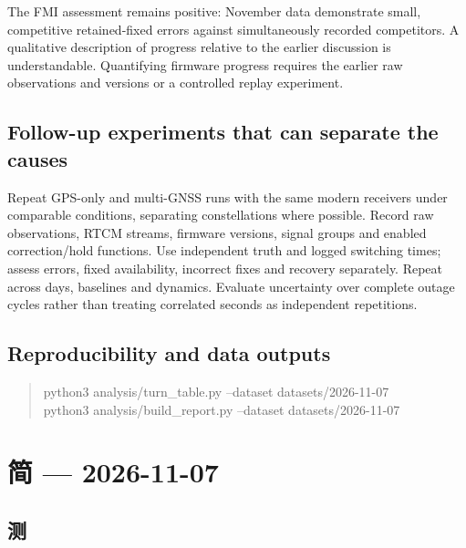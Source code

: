 \documentclass[11pt,a4paper]{article}
\numberwithin{equation}{section}
\numberwithin{figure}{section}
\begin{document}
The FMI assessment remains positive: November data demonstrate small, competitive retained-fixed errors against simultaneously recorded competitors. A qualitative description of progress relative to the earlier discussion is understandable. Quantifying firmware progress requires the earlier raw observations and versions or a controlled replay experiment.

\subsection{Follow-up experiments that can separate the causes}

Repeat GPS-only and multi-GNSS runs with the same modern receivers under comparable conditions, separating constellations where possible. Record raw observations, RTCM streams, firmware versions, signal groups and enabled correction/\allowbreak{}hold functions. Use independent truth and logged switching times; assess errors, fixed availability, incorrect fixes and recovery separately. Repeat across days, baselines and dynamics. Evaluate uncertainty over complete outage cycles rather than treating correlated seconds as independent repetitions.

\subsection{Reproducibility and data outputs}

\begin{quote}\ttfamily\footnotesize python3 analysis/\allowbreak{}turn\_table.py --dataset datasets/\allowbreak{}2026-11-07\\python3 analysis/\allowbreak{}build\_report.py --dataset datasets/\allowbreak{}2026-11-07\end{quote}

\clearpage\section{{\cjkfont 简}\allowbreak{} — 2026-11-07}

\subsection{{\cjkfont 测}\allowbreak{}}
\end{document}
